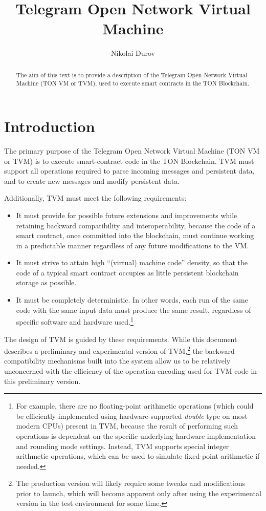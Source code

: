 \documentclass[12pt,oneside]{article}
\title{Telegram Open Network Virtual Machine}
\author{Nikolai Durov}
\def\markbothsame#1{\fancyhead[C]{#1}}
\begin{document}
\maketitle

\begin{abstract}
  The aim of this text is to provide a description of the Telegram
  Open Network Virtual Machine (TON VM or TVM), used to execute smart
  contracts in the TON Blockchain.
\end{abstract}

\section*{Introduction}
\markbothsame{Introduction}

The primary purpose of the Telegram Open Network Virtual Machine (TON VM or TVM) is to execute smart-contract code in the TON Blockchain. TVM must support all operations required to parse incoming messages and persistent data, and to create new messages and modify persistent data.

Additionally, TVM must meet the following requirements:
\begin{itemize}
\item It must provide for possible future extensions and improvements while retaining backward compatibility and interoperability, because the code of a smart contract, once committed into the blockchain, must continue working in a predictable manner regardless of any future modifications to the VM.
\item It must strive to attain high ``(virtual) machine code'' density, so that the code of a typical smart contract occupies as little persistent block\-chain storage as possible.
\item It must be completely deterministic. In other words, each run of the same code with the same input data must produce the same result, regardless of specific software and hardware used.\footnote{For example, there are no floating-point arithmetic operations (which could be efficiently implemented using hardware-supported {\em double\/} type on most modern CPUs) present in TVM, because the result of performing such operations is dependent on the specific underlying hardware implementation and rounding mode settings. Instead, TVM supports special integer arithmetic operations, which can be used to simulate fixed-point arithmetic if needed.}
\end{itemize}
The design of TVM is guided by these requirements. While this document describes a preliminary and experimental version of TVM,\footnote{The production version will likely require some tweaks and modifications prior to launch, which will become apparent only after using the experimental version in the test environment for some time.} the backward compatibility mechanisms built into the system allow us to be relatively unconcerned with the efficiency of the operation encoding used for TVM code in this preliminary version.
\end{document}
